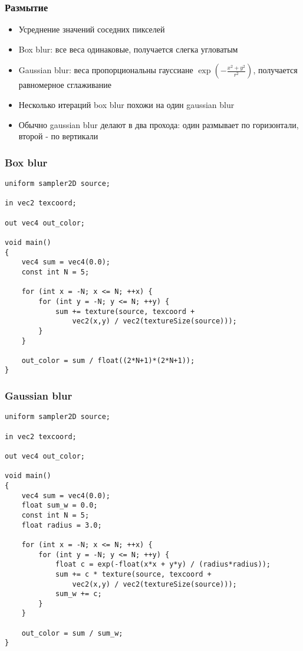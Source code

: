 \documentclass{beamer}
\begin{document}
\begin{frame}[fragile]
\frametitle{Размытие}
\begin{itemize}
\item Усреднение значений соседних пикселей
\pause
\item Box blur: все веса одинаковые, получается слегка угловатым
\pause
\item Gaussian blur: веса пропорциональны гауссиане \begin{math}\exp\left(-\frac{x^2+y^2}{r^2}\right)\end{math}, получается равномерное сглаживание
\pause
\item Несколько итераций box blur похожи на один gaussian blur
\pause
\item Обычно gaussian blur делают в два прохода: один размывает по горизонтали, второй - по вертикали
\end{itemize}
\end{frame}

\begin{frame}[fragile]
\frametitle{Box blur}
\fontsize{10pt}{10pt}
\begin{verbatim}
uniform sampler2D source;

in vec2 texcoord;

out vec4 out_color;

void main()
{
    vec4 sum = vec4(0.0);
    const int N = 5;

    for (int x = -N; x <= N; ++x) {
        for (int y = -N; y <= N; ++y) {
            sum += texture(source, texcoord +
                vec2(x,y) / vec2(textureSize(source)));
        }
    }

    out_color = sum / float((2*N+1)*(2*N+1));
}
\end{verbatim}
\end{frame}

\begin{frame}[fragile]
\frametitle{Gaussian blur}
\fontsize{10pt}{10pt}
\begin{verbatim}
uniform sampler2D source;

in vec2 texcoord;

out vec4 out_color;

void main()
{
    vec4 sum = vec4(0.0);
    float sum_w = 0.0;
    const int N = 5;
    float radius = 3.0;

    for (int x = -N; x <= N; ++x) {
        for (int y = -N; y <= N; ++y) {
            float c = exp(-float(x*x + y*y) / (radius*radius));
            sum += c * texture(source, texcoord +
                vec2(x,y) / vec2(textureSize(source)));
            sum_w += c;
        }
    }

    out_color = sum / sum_w;
}
\end{verbatim}
\end{frame}
\end{document}
